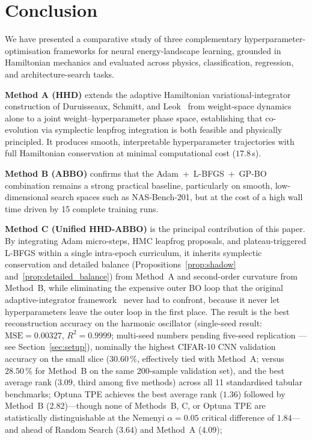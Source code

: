 \documentclass[11pt]{article}
\theoremstyle{definition}
\begin{document}

\section{Conclusion}

We have presented a comparative study of three complementary
hyperparameter-optimisation frameworks for neural energy-landscape
learning, grounded in Hamiltonian mechanics and evaluated across
physics, classification, regression, and architecture-search tasks.

\textbf{Method A (HHD)} extends the adaptive Hamiltonian
variational-integrator construction of Duruisseaux, Schmitt, and
Leok~\cite{duruisseaux2021adaptive} from weight-space dynamics alone
to a joint weight--hyperparameter phase space, establishing that
co-evolution via symplectic leapfrog integration is both feasible and
physically principled. It produces smooth, interpretable
hyperparameter trajectories with full Hamiltonian conservation at
minimal computational cost ($17.8$\,s).

\textbf{Method B (ABBO)} confirms that the Adam~$+$~L-BFGS~$+$~GP-BO
combination remains a strong practical baseline, particularly on
smooth, low-dimensional search spaces such as NAS-Bench-201, but at
the cost of a high wall time driven by 15 complete training runs.

\textbf{Method C (Unified HHD-ABBO)} is the principal contribution of
this paper. By integrating Adam micro-steps, HMC leapfrog proposals,
and plateau-triggered L-BFGS within a single intra-epoch curriculum,
it inherits symplectic conservation and detailed balance
(Propositions~\ref{prop:shadow} and~\ref{prop:detailed_balance}) from
Method~A and second-order curvature from Method~B, while eliminating
the expensive outer BO loop that the original adaptive-integrator
framework~\cite{duruisseaux2021adaptive} never had to confront,
because it never let hyperparameters leave the outer loop in the
first place. The result is the best reconstruction accuracy on the
harmonic oscillator (single-seed result: $\mathrm{MSE}=0.00327$,
$R^2=0.9999$; multi-seed numbers pending five-seed replication
---see Section~\ref{sec:setup}),
nominally the highest CIFAR-10 CNN validation accuracy on the
small slice ($30.60\,\%$, effectively tied with Method~A; versus
$28.50\,\%$ for
Method~B on the same 200-sample validation set), and the best average
rank ($3.09$, third among five methods) across all 11 standardised
tabular benchmarks; Optuna TPE achieves the best average rank
($1.36$) followed by Method~B ($2.82$)---though none of Methods~B,
C, or Optuna TPE are statistically distinguishable at the Nemenyi
$\alpha=0.05$ critical difference of $1.84$---and ahead of
Random Search ($3.64$) and Method~A ($4.09$);
\end{document}
